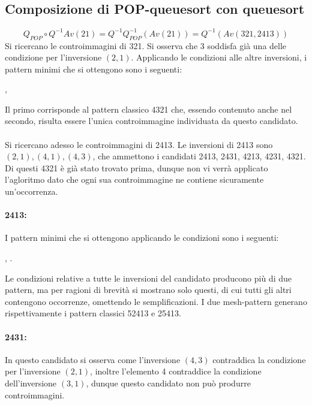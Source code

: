 \subsection{Composizione di {POP-queuesort} con {queuesort}}
$$Q_{POP}\circ Q^{-1}Av(21) = Q^{-1}Q_{POP}^{-1}(Av(21)) = Q^{-1}(Av(321, 2413))$$
Si ricercano le controimmagini di 321. Si osserva che 3 soddisfa gi\`a una delle condizione per l'inversione $(2,1)$. Applicando le condizioni alle altre inversioni, i pattern minimi che si ottengono sono i seguenti:
\begin{center}
, 
\end{center}
Il primo corrisponde al pattern classico 4321 che, essendo contenuto anche nel secondo, risulta essere l'unica controimmagine individuata da questo candidato.\\\\
Si ricercano adesso le controimmagini di 2413. Le inversioni di 2413 sono $(2,1),(4,1),(4,3)$, che ammettono i candidati 2413, 2431, 4213, 4231, 4321. Di questi 4321 \`e gi\`a stato trovato prima, dunque non vi verr\`a applicato l'agloritmo dato che ogni sua controimmagine ne contiene sicuramente un'occorrenza.
\paragraph*{2413:} I pattern minimi che si ottengono applicando le condizioni sono i seguenti:
\begin{center}
, 
.
\end{center}
Le condizioni relative a tutte le inversioni del candidato producono pi\`u di due pattern, ma per ragioni di brevit\`a si mostrano solo questi, di cui tutti gli altri contengono occorrenze, omettendo le semplificazioni. I due mesh-pattern generano rispettivamente i pattern classici 52413 e 25413.
\paragraph*{2431:} In questo candidato si osserva come l'inversione $(4,3)$ contraddica la condizione per l'inversione $(2,1)$, inoltre l'elemento 4 contraddice la condizione dell'inversione $(3,1)$, dunque questo candidato non pu\`o produrre controimmagini.
